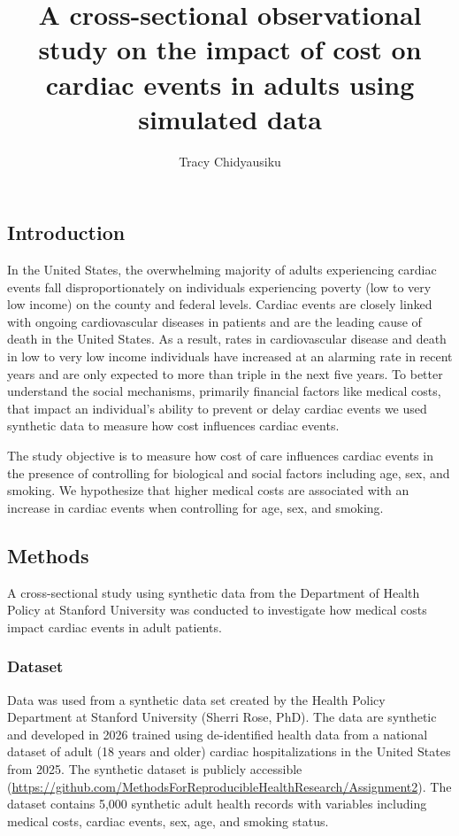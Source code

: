 \documentclass[
  letterpaper,
  DIV=11,
  numbers=noendperiod]{scrartcl}
\title{A cross-sectional observational study on the impact of cost on
cardiac events in adults using simulated data}
\author{Tracy Chidyausiku}
\date{}
\begin{document}
\maketitle


\subsection{Introduction}\label{introduction}

In the United States, the overwhelming majority of adults experiencing
cardiac events fall disproportionately on individuals experiencing
poverty (low to very low income) on the county and federal levels.
Cardiac events are closely linked with ongoing cardiovascular diseases
in patients and are the leading cause of death in the United States. As
a result, rates in cardiovascular disease and death in low to very low
income individuals have increased at an alarming rate in recent years
and are only expected to more than triple in the next five years. To
better understand the social mechanisms, primarily financial factors
like medical costs, that impact an individual's ability to prevent or
delay cardiac events we used synthetic data to measure how cost
influences cardiac events.

The study objective is to measure how cost of care influences cardiac
events in the presence of controlling for biological and social factors
including age, sex, and smoking. We hypothesize that higher medical
costs are associated with an increase in cardiac events when controlling
for age, sex, and smoking.

\subsection{Methods}\label{methods}

A cross-sectional study using synthetic data from the Department of
Health Policy at Stanford University was conducted to investigate how
medical costs impact cardiac events in adult patients.

\subsubsection{Dataset}\label{dataset}

Data was used from a synthetic data set created by the Health Policy
Department at Stanford University (Sherri Rose, PhD). The data are
synthetic and developed in 2026 trained using de-identified health data
from a national dataset of adult (18 years and older) cardiac
hospitalizations in the United States from 2025. The synthetic dataset
is publicly accessible
(\url{https://github.com/MethodsForReproducibleHealthResearch/Assignment2}).
The dataset contains 5,000 synthetic adult health records with variables
including medical costs, cardiac events, sex, age, and smoking status.
\end{document}
